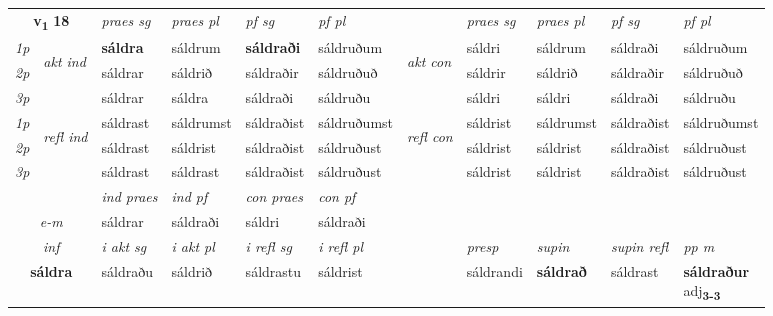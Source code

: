 \noindent
\begin{tabular}{lllllllllll} \toprule
\multicolumn{2}{c}{\textbf{v{\textsubscript{1}}} \Large{\textbf{18}}}  &  \textit{praes sg}  & \textit{praes pl}  &\textit{ pf sg} & \textit{pf pl} &  &  \textit{praes sg}  & \textit{praes pl}  & \textit{pf sg} & \textit{pf pl } \\*
	\cmidrule{3-6} \cmidrule{8-11}
 {\textit{1p}} & \multirow{3}{*}{\begin{turn}{90}\textit{akt ind}\end{turn}} & \textbf{sáldra} & sáldrum & \textbf{sáldraði} & sáldruðum & \multirow{3}{*}{\begin{turn}{90}\textit{akt con}\end{turn}} &sáldri & sáldrum & sáldraði & sáldruðum\\*
 {\textit{2p}} &  &  sáldrar  & sáldrið & sáldraðir & sáldruðuð & & sáldrir & sáldrið & sáldraðir & sáldruðuð \\*
{\textit{3p}} &  & sáldrar & sáldra & sáldraði & sáldruðu & & sáldri & sáldri& sáldraði & sáldruðu \\*
\cmidrule{3-6} \cmidrule{8-11}
 {\textit{1p}} & \multirow{3}{*}{\begin{turn}{90}\textit{refl ind}\end{turn}}  & sáldrast & sáldrumst & sáldraðist & sáldruðumst & \multirow{3}{*}{\begin{turn}{90}\textit{refl con}\end{turn}}  &sáldrist & sáldrumst & sáldraðist & sáldruðumst \\*
 {\textit{2p}} &  & sáldrast & sáldrist & sáldraðist & sáldruðust & &sáldrist & sáldrist & sáldraðist & sáldruðust \\*
 {\textit{3p}}  & & sáldrast & sáldrast & sáldraðist & sáldruðust & & sáldrist & sáldrist& sáldraðist & sáldruðust \\*
\cmidrule{3-6} \cmidrule{8-11}

   & &  \textit{ind praes} & \textit{ind pf} & \textit{con praes} & \textit{con pf} \\*
\multicolumn{2}{c}{ \textit{e-m} } & sáldrar & sáldraði & sáldri & sáldraði \\*

\cmidrule{3-11}
   \multicolumn{2}{c}{\textit{inf}}  & \textit{i akt sg} & \textit{i akt pl} & \textit{i refl sg} & \textit{i refl pl} && \textit{presp} & \textit{supin} & \textit{supin refl} & \textit{pp m} \\*
  \multicolumn{2}{c}{\textbf{sáldra}} & sáldraðu  & sáldrið & sáldrastu & sáldrist && sáldrandi &  \textbf{sáldrað} & sáldrast & \specialcell{\textbf{sáldraður} \\ adj\textbf{\textsubscript{3-3}}} \\*
\end{tabular}

